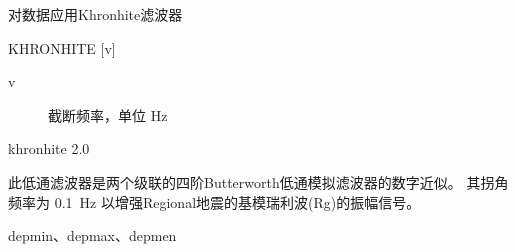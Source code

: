 \label{cmd:khronhite}

对数据应用Khronhite滤波器

\begin{SACSTX}
KHRONHITE [v]
\end{SACSTX}

\begin{description}
\item [v] 截断频率，单位 \si{\Hz}
\end{description}

\begin{SACDFT}
khronhite 2.0
\end{SACDFT}

此低通滤波器是两个级联的四阶Butterworth低通模拟滤波器的数字近似。
其拐角频率为 \SI{0.1}{\Hz} 以增强Regional地震的基模瑞利波(Rg)的振幅信号。

depmin、depmax、depmen
